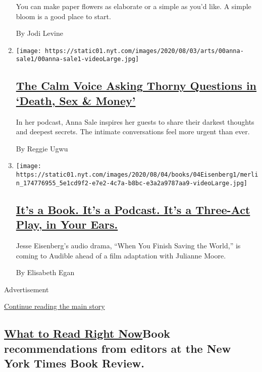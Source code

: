 \begin{enumerate}
  You can make paper flowers as elaborate or a simple as you'd like. A
  simple bloom is a good place to start.

  By Jodi Levine
\item
  \texttt{[image: https://static01.nyt.com/images/2020/08/03/arts/00anna-sale1/00anna-sale1-videoLarge.jpg]}

  \hypertarget{the-calm-voice-asking-thorny-questions-in-death-sex--money}{%
  \subsection{\texorpdfstring{\href{/2020/08/02/arts/anna-sale-death-sex-money-podcast.html}{The
  Calm Voice Asking Thorny Questions in `Death, Sex \&
  Money'}}{The Calm Voice Asking Thorny Questions in `Death, Sex \& Money'}}\label{the-calm-voice-asking-thorny-questions-in-death-sex--money}}

  In her podcast, Anna Sale inspires her guests to share their darkest
  thoughts and deepest secrets. The intimate conversations feel more
  urgent than ever.

  By Reggie Ugwu
\item
  \texttt{[image: https://static01.nyt.com/images/2020/08/04/books/04Eisenberg1/merlin\_174776955\_5e1cd9f2-e7e2-4c7a-b8bc-e3a2a9787aa9-videoLarge.jpg]}

  \hypertarget{its-a-book-its-a-podcast-its-a-three-act-play-in-your-ears}{%
  \subsection{\texorpdfstring{\href{/2020/08/02/books/jesse-eisenberg-when-you-finish-saving-the-world-audio.html}{It's
  a Book. It's a Podcast. It's a Three-Act Play, in Your
  Ears.}}{It's a Book. It's a Podcast. It's a Three-Act Play, in Your Ears.}}\label{its-a-book-its-a-podcast-its-a-three-act-play-in-your-ears}}

  Jesse Eisenberg's audio drama, ``When You Finish Saving the World,''
  is coming to Audible ahead of a film adaptation with Julianne Moore.

  By Elisabeth Egan
\end{enumerate}

Advertisement

\protect\hyperlink{after-mid2}{Continue reading the main story}

\hypertarget{what-to-read-right-nowbook-recommendations-from-editors-at-the-new-york-times-book-review}{%
\subsection{\texorpdfstring{\href{/spotlight/books-to-read}{What to Read
Right Now}Book recommendations from editors at the New York Times Book
Review.}{What to Read Right NowBook recommendations from editors at the New York Times Book Review.}}\label{what-to-read-right-nowbook-recommendations-from-editors-at-the-new-york-times-book-review}}

